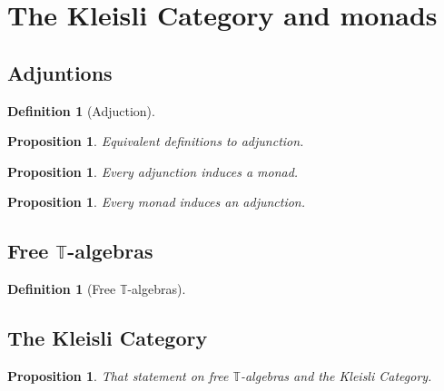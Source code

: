 \documentclass[a4paper]{article}
\theoremstyle{plain}
\newtheorem{proposition}[theorem]{Proposition}
\theoremstyle{definition}
\newtheorem{definition}[theorem]{Definition}
\newcommand{\cat}[1]{\mathcal{#1}}
\begin{document}

\section{The Kleisli Category and monads}
\subsection{Adjuntions}
\begin{definition}[Adjuction]
\end{definition}
\begin{proposition}
    Equivalent definitions to adjunction.
\end{proposition}
\begin{proposition}
    Every adjunction induces a monad.
\end{proposition}
\begin{proposition}
    Every monad induces an adjunction.
\end{proposition}
\subsection{Free \texorpdfstring{$\mathbb{T}$}{T}-algebras}
\begin{definition}[Free $\mathbb{T}$-algebras]
\end{definition}
\subsection{The Kleisli Category}
\begin{proposition}
    That statement on free $\mathbb{T}$-algebras and the Kleisli Category.
\end{proposition}
\end{document}
